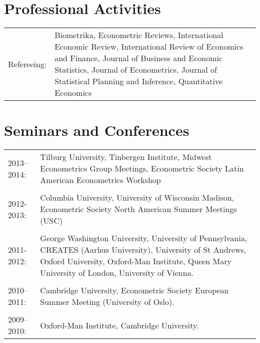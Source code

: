 \documentclass[11pt,line,overlapped,letterpaper]{myres}
\begin{document}
\begin{resume}
\section{\sc Professional Activities}
\vspace{1em}

\begin{tabular}{p{2cm}p{12cm}}
Refereeing: & Biometrika, 
Econometric Reviews, 
International Economic Review,  
International Review of Economics and Finance,
Journal of Business and Economic Statistics, 
Journal of Econometrics,
Journal of Statistical Planning and Inference, 
Quantitative Economics

\end{tabular}




\section{\sc Seminars and Conferences}
\vspace{1em}

\begin{tabular}{p{2cm}p{12cm}}
2013--2014: & Tilburg University, Tinbergen Institute, Midwest Econometrics Group Meetings, Econometric Society Latin American Econometrics Workshop\\ \\
2012-2013: & Columbia University, University of Wisconsin Madison, Econometric Society North American Summer Meetings (USC) \\\\
2011-2012: &  George Washington University, University of Pennsylvania, CREATES (Aarhus University), University of St Andrews, Oxford University, Oxford-Man Institute, Queen Mary University of London, University of Vienna. \\\\

2010--2011: &Cambridge University, Econometric Society European Summer Meeting (University of Oslo).\\\\

2009--2010: &Oxford-Man Institute, Cambridge University.
\end{tabular}



\end{resume}
\end{document}
